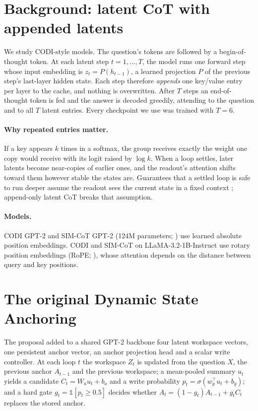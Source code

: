 \documentclass[11pt]{article}
\begin{document}
\section{Background: latent CoT with appended latents}
\label{sec:background}

We study CODI-style models. The question's tokens are followed by a begin-of-thought token. At each latent step $t = 1,
\dots, T$, the model runs one forward step whose input embedding is $z_t = P(h_{t-1})$, a learned projection $P$ of the
previous step's last-layer hidden state. Each step therefore \emph{appends} one key/value entry per layer to the cache, and
nothing is overwritten. After $T$ steps an end-of-thought token is fed and the answer is decoded greedily, attending to the
question and to all $T$ latent entries. Every checkpoint we use was trained with $T = 6$.

\paragraph{Why repeated entries matter.} If a key appears $k$ times in a softmax, the group receives exactly the weight one
copy would receive with its logit raised by $\log k$. When a loop settles, later latents become near-copies of earlier ones,
and the readout's attention shifts toward them however stable the states are. Guarantees that a settled loop is safe to run
deeper assume the readout sees the current state in a fixed context \citep{viakhirev2026thinkshallow,
blayney2026mechanistic}; append-only latent CoT breaks that assumption.

\paragraph{Models.} CODI GPT-2 and SIM-CoT GPT-2 (124M parameters; \citealp{radford2019gpt2}) use learned absolute position
embeddings. CODI and SIM-CoT on LLaMA-3.2-1B-Instruct \citep{grattafiori2024llama3} use rotary position embeddings (RoPE;
\citealp{su2024roformer}), whose attention depends on the distance between query and key positions.

\section{The original Dynamic State Anchoring}
\label{sec:original}

The proposal added to a shared GPT-2 backbone four latent workspace vectors, one persistent anchor vector, an anchor
projection head and a scalar write controller. At each loop $t$ the workspace $Z_t$ is updated from the question $X$, the
previous anchor $A_{t-1}$ and the previous workspace; a mean-pooled summary $u_t$ yields a candidate $C_t = W_a u_t + b_a$
and a write probability $p_t = \sigma(w_g^\top u_t + b_g)$; and a hard gate $g_t = \mathbb{1}[p_t \geq 0.5]$ decides whether
$A_t = (1 - g_t) A_{t-1} + g_t C_t$ replaces the stored anchor.
\end{document}
